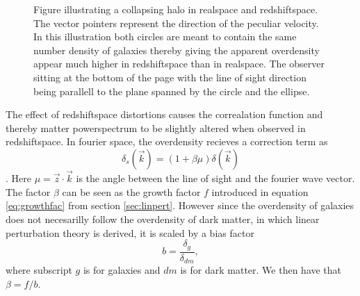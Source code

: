 \begin{figure}[htbp]\label{fig:rsddistortion}
    \caption{Figure illustrating a collapsing halo in realspace and redshiftspace. The vector pointers represent the direction of the peculiar velocity. In this illustration both circles are meant to contain the same number density of galaxies thereby giving the apparent overdensity appear much higher in redshiftspace than in realspace. The observer sitting at the bottom of the page with the line of sight direction being parallell to the plane spanned by the circle and the ellipse.}
\end{figure}
The effect of redshiftspace distortions causes the correalation function and thereby
matter powerspectrum to be slightly altered when observed in redshiftspace. In
fourier space, the overdensity recieves a correction term as
\begin{equation}
    \delta_s(\vec{k})=(1+\beta\mu)\delta(\vec{k})
\end{equation}
\cite[p.~279]{Dodelson:1282338}. Here $\mu=\vec{z}\cdot\vec{k}$ is the angle
between the line of sight and the fourier wave vector. The factor $\beta$ can be
seen as the growth factor $f$ introduced in equation \ref{eq:growthfac} from
section \ref{sec:linpert}. However since the overdensity of galaxies does not
necesarilly follow the overdensity of dark matter, in which linear perturbation
theory is derived, it is scaled by a bias factor
\begin{equation}
    b=\frac{\delta_g}{\delta_{dm}},
\end{equation}
where subscript $g$ is for galaxies and $dm$ is for dark matter. We then have
that $\beta=f/b$.
